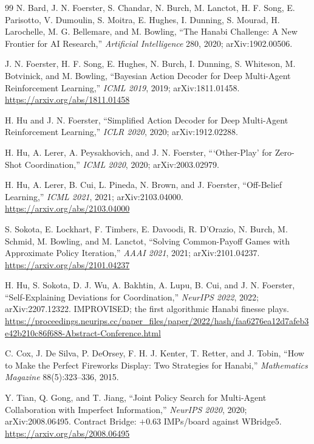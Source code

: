 \begin{thebibliography}{99}
N. Bard, J. N. Foerster, S. Chandar, N. Burch, M. Lanctot, H. F. Song,
E. Parisotto, V. Dumoulin, S. Moitra, E. Hughes, I. Dunning, S. Mourad,
H. Larochelle, M. G. Bellemare, and M. Bowling, ``The Hanabi Challenge: A New
Frontier for AI Research,'' \emph{Artificial Intelligence} 280, 2020;
arXiv:1902.00506.

J. N. Foerster, H. F. Song, E. Hughes, N. Burch, I. Dunning, S. Whiteson,
M. Botvinick, and M. Bowling, ``Bayesian Action Decoder for Deep Multi-Agent
Reinforcement Learning,'' \emph{ICML 2019}, 2019; arXiv:1811.01458.\\
\url{https://arxiv.org/abs/1811.01458}

H. Hu and J. N. Foerster, ``Simplified Action Decoder for Deep Multi-Agent
Reinforcement Learning,'' \emph{ICLR 2020}, 2020; arXiv:1912.02288.

H. Hu, A. Lerer, A. Peysakhovich, and J. N. Foerster, ```Other-Play' for
Zero-Shot Coordination,'' \emph{ICML 2020}, 2020; arXiv:2003.02979.

H. Hu, A. Lerer, B. Cui, L. Pineda, N. Brown, and J. Foerster, ``Off-Belief
Learning,'' \emph{ICML 2021}, 2021; arXiv:2103.04000.\\
\url{https://arxiv.org/abs/2103.04000}

S. Sokota, E. Lockhart, F. Timbers, E. Davoodi, R. D'Orazio, N. Burch,
M. Schmid, M. Bowling, and M. Lanctot, ``Solving Common-Payoff Games with
Approximate Policy Iteration,'' \emph{AAAI 2021}, 2021; arXiv:2101.04237.\\
\url{https://arxiv.org/abs/2101.04237}

H. Hu, S. Sokota, D. J. Wu, A. Bakhtin, A. Lupu, B. Cui, and J. N. Foerster,
``Self-Explaining Deviations for Coordination,'' \emph{NeurIPS 2022}, 2022;
arXiv:2207.12322. IMPROVISED; the first algorithmic Hanabi finesse plays.\\
\url{https://proceedings.neurips.cc/paper_files/paper/2022/hash/faa6276ea12d7afeb3e42b210c86f688-Abstract-Conference.html}

C. Cox, J. De Silva, P. DeOrsey, F. H. J. Kenter, T. Retter, and J. Tobin, ``How
to Make the Perfect Fireworks Display: Two Strategies for Hanabi,''
\emph{Mathematics Magazine} 88(5):323--336, 2015.

Y. Tian, Q. Gong, and T. Jiang, ``Joint Policy Search for Multi-Agent
Collaboration with Imperfect Information,'' \emph{NeurIPS 2020}, 2020;
arXiv:2008.06495. Contract Bridge: $+0.63$ IMPs/board against WBridge5.\\
\url{https://arxiv.org/abs/2008.06495}


\end{thebibliography}
